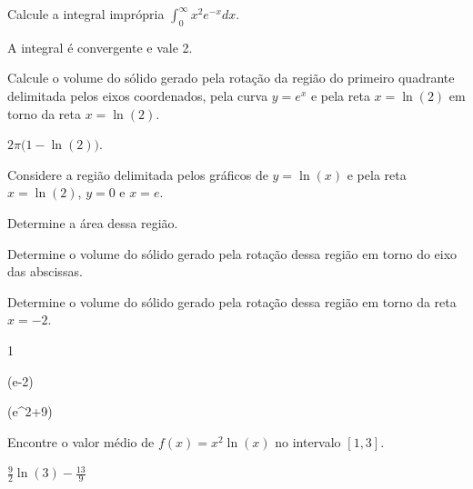 \begin{exercises}
\begin{exercise}
Calcule a integral imprópria \(\int_0^{\infty} x^2e^{-x}dx\).
\begin{answer}
A integral é convergente e vale 2.
\end{answer}
\end{exercise}

\begin{exercise}
Calcule o volume do sólido gerado pela rotação da região do primeiro quadrante
delimitada pelos eixos coordenados, pela curva $y=e^x$ e pela reta $x=\ln(2)$
em torno da reta $x=\ln(2)$.
\begin{answer}
\(2\pi\big(1-\ln(2)\big)\).
\end{answer}
\end{exercise}

\begin{exercise}
  Considere a região delimitada pelos gráficos de $y=\ln(x)$
  e pela reta $x=\ln(2)$, $y=0$ e $x=e$.
  \begin{alphalist}
      \item Determine a área dessa região.
      \item Determine o volume do sólido gerado pela rotação dessa
            região em torno do eixo das abscissas.
      \item Determine o volume do sólido gerado pela rotação dessa
            região em torno da reta $x=-2$.
  \end{alphalist}
  \begin{answer}
    \begin{mathlist}[2]
      \item 1
      \item (e-2)\pi
      \item {}\left(e^2+9\right)
    \end{mathlist}
  \end{answer}
\end{exercise}

\begin{exercise}
  Encontre o valor médio de $f(x)= x^2\ln(x)$ no intervalo $[1,3]$.
  \begin{answer}
  $\frac{9}{2}\ln(3)- \frac{13}{9}$
  \end{answer}
\end{exercise}


\end{exercises}

